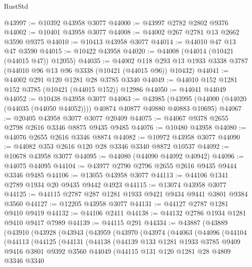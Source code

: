 \begin{lexlean}{RustStd}
\begin{coremodule}
@43997 := @10392 @43958 @3077
@44000 := @43997 @2782 @2802 @9376
@44002 := @10401 @43958 @3077
@44008 := @44002 @267 @2781 @13 @2662 @3590 @9375
@44010 := @10413 @43958 @3077
@44014 := @44010 @47 @13 @47 @3590
@44015 := @10422 @43958
@44020 := @44008 (@44014 (@10421 (@44015 @47)) @12055)
@44035 := @44002
    @118
    @293
    @13
    @1933
    @3338
    @3787
    (@44010 @96 @13 @96 @3338 (@10421 (@44015 @96)) @10432)
@44041 := @44002 @291 @120 @1281 @28 @3785 @3340
@44049 := @44010 @152 @1281 @152 @3785 (@10421 (@44015 @152)) @12986
@44050 := @44041 @44049
@44052 := @10438 @43958 @3077
@44063 := @43985
    (@43995 (@44000 (@44020 (@44035 (@44050 @44052)))) @40874 @40877 @40880 @40883 @10695)
@44067 := @20405 @43958 @3077 @3077 @20409
@44075 := @44067 @9378 @2655 @2798 @2616 @3346 @8875 @9435 @9485
@44076 := @10480 @43958
@44080 := @44076 @2655 @2616 @3346 @8874
@44082 := @10972 @43958 @3077
@44090 := @44082 @353 @2616 @120 @28 @3346 @3340 @8872 @10537
@44092 := @10678 @43958 @3077
@44095 := @44080 (@44090 @44092 @40942)
@44096 := @44075 @44095
@44104 := @43977 @2790 @2796 @2655 @2616 @9435 @9444 @3346 @9485
@44106 := @13055 @43958 @3077
@44113 := @44106 @1341 @2789 @1934 @20 @9435 @9442 @4923
@44115 := @13074 @43958 @3077
@44125 := @44115 @2787 @287 @1281 @1933 @9421 @9434 @9441 @3801 @9384 @3560
@44127 := @12205 @43958 @3077
@44131 := @44127 @2787 @1281 @9410 @9419
@44132 := @44106 @2411
@44138 := @44132 @2786 @1934 @1281 @9410 @9417 @7989
@44139 := @44115 @291
@44334 := @43887
    (@43889
      (@43910
        (@43928
          (@43943
            (@43959
              (@43970
                (@43974
                  (@44063
                    (@44096
                      (@44104
                        (@44113
                          (@44125
                            (@44131
                              (@44138
                                (@44139
                                  @133
                                  @1281
                                  @1933
                                  @3785
                                  @9409
                                  @9416
                                  @3801
                                  @9392
                                  @3560
                                  @44049
                                  (@44115
                                    @131
                                    @120
                                    @1281
                                    @28
                                    @4809
                                    @3346
                                    @3340

\end{coremodule}
\end{lexlean}
